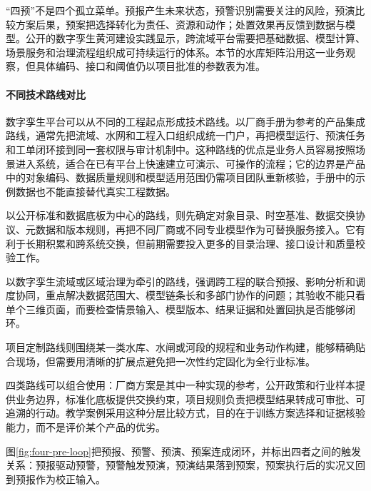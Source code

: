 “四预”不是四个孤立菜单。预报产生未来状态，预警识别需要关注的风险，预演比较方案后果，预案把选择转化为责任、资源和动作；处置效果再反馈到数据与模型。公开的数字孪生黄河建设实践显示，跨流域平台需要把基础数据、模型计算、场景服务和治理流程组织成可持续运行的体系\cite{twinYellowRiver2024}。本节的水库矩阵沿用这一业务观察，但具体编码、接口和阈值仍以项目批准的参数表为准。

\paragraph{不同技术路线对比}
数字孪生平台可以从不同的工程起点形成技术路线。以厂商手册为参考的产品集成路线，通常先把流域、水网和工程入口组织成统一门户，再把模型运行、预演任务和工单闭环接到同一套权限与审计机制中。这种路线的优点是业务人员容易按照场景进入系统，适合在已有平台上快速建立可演示、可操作的流程；它的边界是产品中的对象编码、数据质量规则和模型适用范围仍需项目团队重新核验，手册中的示例数据也不能直接替代真实工程数据。

以公开标准和数据底板为中心的路线，则先确定对象目录、时空基准、数据交换协议、元数据和版本规则，再把不同厂商或不同专业模型作为可替换服务接入。它有利于长期积累和跨系统交换，但前期需要投入更多的目录治理、接口设计和质量校验工作。

以数字孪生流域或区域治理为牵引的路线，强调跨工程的联合预报、影响分析和调度协同，重点解决数据范围大、模型链条长和多部门协作的问题；其验收不能只看单个三维页面，而要检查情景输入、模型版本、结果证据和处置回执是否能够闭环。

项目定制路线则围绕某一类水库、水闸或河段的规程和业务动作构建，能够精确贴合现场，但需要用清晰的扩展点避免把一次性约定固化为全行业标准。

四类路线可以组合使用：厂商方案是其中一种实现的参考，公开政策和行业样本提供业务边界，标准化底板提供交换约束，项目规则负责把模型结果转成可审批、可追溯的行动。教学案例采用这种分层比较方式，目的在于训练方案选择和证据核验能力，而不是评价某个产品的优劣。

图\ref{fig:four-pre-loop}把预报、预警、预演、预案连成闭环，并标出四者之间的触发关系：预报驱动预警，预警触发预演，预演结果落到预案，预案执行后的实况又回到预报作为校正输入。

